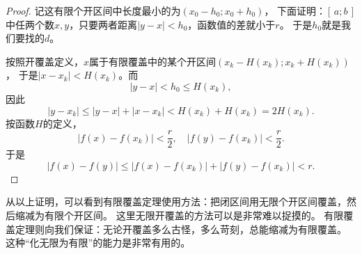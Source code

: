 \documentclass[12pt,UTF8,fontset=none]{ctexbook}
\begin{document}
\begin{appendix}
\begin{proof}
    记这有限个开区间中长度最小的为$(x_0 - h_0; x_0 + h_0)$，
    下面证明：$[\,a; b\,]$中任两个数$x,y$，只要两者距离$|y - x| < h_0$，函数值的差就小于$r$。
    于是$h_0$就是我们要找的$d$。

    按照开覆盖定义，$x$属于有限覆盖中的某个开区间$(x_k - H(x_k); x_k + H(x_k))$，
    于是$|x - x_k| < H(x_k)$。而
    $$|y - x| < h_0 \leqslant H(x_k),$$
    因此
    $$|y - x_k| \leqslant |y - x| + |x - x_k| < H(x_k) + H(x_k) = 2H(x_k).$$
    按函数$H$的定义，
    $$ |f(x) - f(x_k)| < \frac{r}{2}, \quad |f(y) - f(x_k)| < \frac{r}{2}. $$
    于是
    $$ |f(x) - f(y)| \leqslant |f(x) - f(x_k)| + |f(y) - f(x_k)| < r. $$

\end{proof}

从以上证明，可以看到有限覆盖定理使用方法：把闭区间用无限个开区间覆盖，然后缩减为有限个开区间。
这里无限开覆盖的方法可以是非常难以捉摸的。
有限覆盖定理则向我们保证：无论开覆盖多么古怪，多么苛刻，总能缩减为有限覆盖。
这种“化无限为有限”的能力是非常有用的。

\end{appendix}
\end{document}

